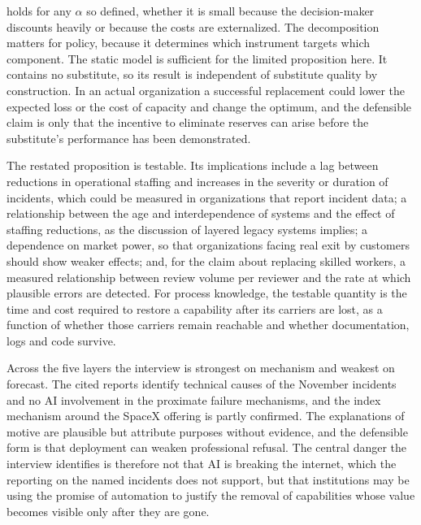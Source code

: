 \documentclass[12pt]{article}
\begin{document}
holds for any $\alpha$ so defined, whether it is small because the decision-maker discounts heavily or because the costs are externalized. The decomposition matters for policy, because it determines which instrument targets which component. The static model is sufficient for the limited proposition here. It contains no substitute, so its result is independent of substitute quality by construction. In an actual organization a successful replacement could lower the expected loss or the cost of capacity and change the optimum, and the defensible claim is only that the incentive to eliminate reserves can arise before the substitute's performance has been demonstrated.

The restated proposition is testable. Its implications include a lag between reductions in operational staffing and increases in the severity or duration of incidents, which could be measured in organizations that report incident data; a relationship between the age and interdependence of systems and the effect of staffing reductions, as the discussion of layered legacy systems implies; a dependence on market power, so that organizations facing real exit by customers should show weaker effects; and, for the claim about replacing skilled workers, a measured relationship between review volume per reviewer and the rate at which plausible errors are detected. For process knowledge, the testable quantity is the time and cost required to restore a capability after its carriers are lost, as a function of whether those carriers remain reachable and whether documentation, logs and code survive.

Across the five layers the interview is strongest on mechanism and weakest on forecast. The cited reports identify technical causes of the November incidents and no AI involvement in the proximate failure mechanisms, and the index mechanism around the SpaceX offering is partly confirmed. The explanations of motive are plausible but attribute purposes without evidence, and the defensible form is that deployment can weaken professional refusal. The central danger the interview identifies is therefore not that AI is breaking the internet, which the reporting on the named incidents does not support, but that institutions may be using the promise of automation to justify the removal of capabilities whose value becomes visible only after they are gone.
\end{document}
